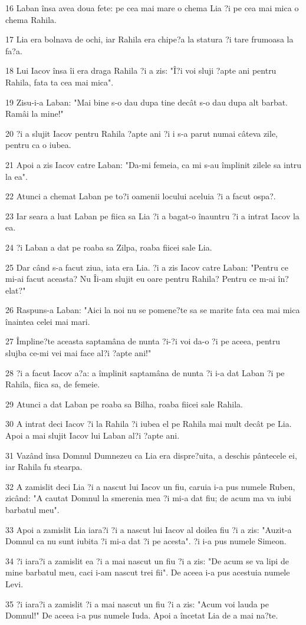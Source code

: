 \par 16 Laban însa avea doua fete: pe cea mai mare o chema Lia ?i pe cea mai mica o chema Rahila.
\par 17 Lia era bolnava de ochi, iar Rahila era chipe?a la statura ?i tare frumoasa la fa?a.
\par 18 Lui Iacov însa îi era draga Rahila ?i a zis: "Î?i voi sluji ?apte ani pentru Rahila, fata ta cea mai mica".
\par 19 Zisu-i-a Laban: "Mai bine s-o dau dupa tine decât s-o dau dupa alt barbat. Ramâi la mine!"
\par 20 ?i a slujit Iacov pentru Rahila ?apte ani ?i i s-a parut numai câteva zile, pentru ca o iubea.
\par 21 Apoi a zis Iacov catre Laban: "Da-mi femeia, ca mi s-au împlinit zilele sa intru la ea".
\par 22 Atunci a chemat Laban pe to?i oamenii locului aceluia ?i a facut ospa?.
\par 23 Iar seara a luat Laban pe fiica sa Lia ?i a bagat-o înauntru ?i a intrat Iacov la ea.
\par 24 ?i Laban a dat pe roaba sa Zilpa, roaba fiicei sale Lia.
\par 25 Dar când s-a facut ziua, iata era Lia. ?i a zis Iacov catre Laban: "Pentru ce mi-ai facut aceasta? Nu Îi-am slujit eu oare pentru Rahila? Pentru ce m-ai în?elat?"
\par 26 Raspuns-a Laban: "Aici la noi nu se pomene?te sa se marite fata cea mai mica înaintea celei mai mari.
\par 27 Împline?te aceasta saptamâna de nunta ?i-?i voi da-o ?i pe aceea, pentru slujba ce-mi vei mai face al?i ?apte ani!"
\par 28 ?i a facut Iacov a?a: a împlinit saptamâna de nunta ?i i-a dat Laban ?i pe Rahila, fiica sa, de femeie.
\par 29 Atunci a dat Laban pe roaba sa Bilha, roaba fiicei sale Rahila.
\par 30 A intrat deci Iacov ?i la Rahila ?i iubea el pe Rahila mai mult decât pe Lia. Apoi a mai slujit Iacov lui Laban al?i ?apte ani.
\par 31 Vazând însa Domnul Dumnezeu ca Lia era dispre?uita, a deschis pântecele ei, iar Rahila fu stearpa.
\par 32 A zamislit deci Lia ?i a nascut lui Iacov un fiu, caruia i-a pus numele Ruben, zicând: "A cautat Domnul la smerenia mea ?i mi-a dat fiu; de acum ma va iubi barbatul meu".
\par 33 Apoi a zamislit Lia iara?i ?i a nascut lui Iacov al doilea fiu ?i a zis: "Auzit-a Domnul ca nu sunt iubita ?i mi-a dat ?i pe acesta". ?i i-a pus numele Simeon.
\par 34 ?i iara?i a zamislit ea ?i a mai nascut un fiu ?i a zis: "De acum se va lipi de mine barbatul meu, caci i-am nascut trei fii". De aceea i-a pus acestuia numele Levi.
\par 35 ?i iara?i a zamislit ?i a mai nascut un fiu ?i a zis: "Acum voi lauda pe Domnul!" De aceea i-a pus numele Iuda. Apoi a încetat Lia de a mai na?te.

